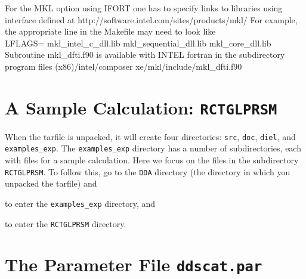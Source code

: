 For the MKL option using IFORT one has to specify links to libraries
using interface defined at
http://software.intel.com/sites/products/mkl/
For example, the appropriate line in the Makefile may need to look like\\
 LFLAGS= mkl\_intel\_c\_dll.lib mkl\_sequential\_dll.lib mkl\_core\_dll.lib\\
Subroutine mkl\_dfti.f90 is available with INTEL fortran in the subdirectory
program files (x86)/intel/composer xe/mkl/include/mkl\_dfti.f90

\section{A Sample Calculation: {\tt RCTGLPRSM}
         \label{sec:sample calculation}}

When the tarfile is unpacked, it will create four directories: {\tt src},
{\tt doc}, {\tt diel}, and {\tt examples\_exp}.
The {\tt examples\_exp} directory has a number of subdirectories,
each with
files for a sample calculation.
Here we focus on the files in the subdirectory {\tt RCTGLPRSM}. 
To follow this, go to the {\tt DDA} directory (the directory in which
you unpacked the tarfile) and

\indent{}

\noindent to enter the {\tt examples\_exp} directory, and

\indent{}

\noindent to enter the {\tt RCTGLPRSM} directory.


\section{The Parameter File {\tt ddscat.par}
        \label{sec:parameter_file}}

